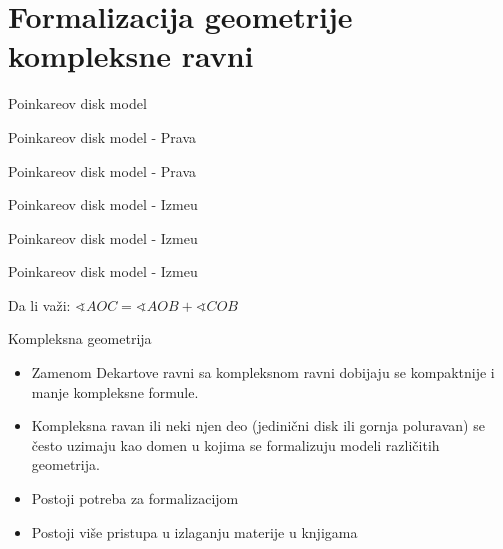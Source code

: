 \documentclass{beamer}
\def\d{{\fontencoding{T1}\selectfont\dj}}
\begin{document}
\section{Formalizacija geometrije kompleksne ravni}

\begin{frame}{Poinkareov disk model}
\begin{center}

\end{center}
\end{frame}

\begin{frame}{Poinkareov disk model - Prava} 
\begin{center}

\end{center}
\end{frame}

\begin{frame}{Poinkareov disk model - Prava} 
\begin{center}

\end{center}
\end{frame}

\begin{frame}{Poinkareov disk model - Izme\d u} 
\begin{center}

\end{center}
\end{frame}

\begin{frame}{Poinkareov disk model - Izme\d u} 
\begin{center}

\end{center}
\end{frame}


\begin{frame}{Poinkareov disk model - Izme\d u} 
\begin{center}

\end{center}

Da li va\v zi: $\sphericalangle AOC = \sphericalangle AOB + \sphericalangle COB$
\end{frame}


\begin{frame}{Kompleksna geometrija}
\begin{itemize}[<+->]
\item Zamenom Dekartove ravni sa kompleksnom ravni dobijaju se kompaktnije i manje kompleksne formule.
\item Kompleksna ravan ili neki njen deo (jedini\v cni disk ili gornja poluravan) se \v cesto uzimaju kao 
      domen u kojima se formalizuju modeli razli\v citih geometrija.
\item Postoji potreba za formalizacijom
\item Postoji vi\v se pristupa u izlaganju materije u knjigama
\end{itemize}
\end{frame}
\end{document}
